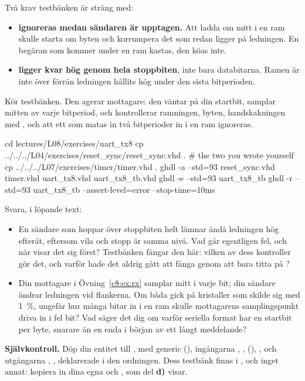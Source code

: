 Två krav testbänken är sträng med:
\begin{itemize}
  \item \textbf{ ignoreras medan sändaren är upptagen.} Att ladda om mitt i en ram skulle
    starta om byten och korrumpera det som redan ligger på ledningen. En begäran som kommer under en
    ram kastas, den köas inte.
  \item \textbf{ ligger kvar hög genom hela stoppbiten}, inte bara databitarna. Ramen är
    inte över förrän ledningen hållits hög under den sista bitperioden.
\end{itemize}

 Kör testbänken. Den agerar mottagare: den väntar på din startbit, samplar mitten av varje
bitperiod, och kontrollerar ramningen, byten, handskakningen med , och att ett
 som matas in två bitperioder in i en ram ignoreras.

\begin{shell}
cd lectures/L08/exercises/uart_tx8
cp ../../../L04/exercises/reset_sync/reset_sync.vhd .     # the two you wrote yourself
cp ../../../L07/exercises/timer/timer.vhd .
ghdl -a --std=93 reset_sync.vhd timer.vhd uart_tx8.vhd uart_tx8_tb.vhd
ghdl -e --std=93 uart_tx8_tb
ghdl -r --std=93 uart_tx8_tb --assert-level=error --stop-time=10ms
\end{shell}

 Svara, i löpande text:
\begin{itemize}
  \item En sändare som hoppar över stoppbiten helt lämnar ändå ledningen hög efteråt, eftersom vila
    och stopp är samma nivå. Vad går egentligen fel, och när visar det sig först? Testbänken fångar
    den här: vilken av dess kontroller gör det, och varför hade det aldrig gått att fånga genom att
    bara titta på ?
  \item Din mottagare i Övning~\ref{c8:ex:rx} samplar mitt i varje bit; din sändare ändrar ledningen
    vid flankerna. Om båda gick på kristaller som skilde sig med 1~\%, ungefär hur många bitar in i
    en ram skulle mottagarens samplingspunkt driva in i fel bit? Vad säger det dig om varför
    seriella format har en startbit per byte, snarare än en enda i början av ett långt meddelande?
\end{itemize}


\begin{selfcheck}
\textbf{Självkontroll.} Döp din entitet till , med generic 
(), ingångarna , , 
(), , och utgångarna , ,
deklarerade i den ordningen. Dess testbänk finns i , och inget annat:
kopiera in dina egna  och , som del \textbf{d)} visar.
\end{selfcheck}
